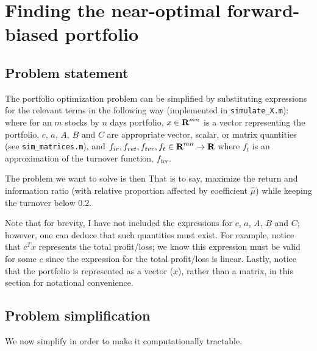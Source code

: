 \documentclass{article}
\begin{document}
 \clearpage
\section{Finding the near-optimal forward-biased portfolio}

\subsection{Problem statement}
    The portfolio optimization problem can be simplified 
        by substituting expressions for the relevant terms in the following way
        (implemented in \verb+simulate_X.m+):
    where for an $m$ stocks by $n$ days portfolio,
        \BI $x \in {\mbox{\bf R}}^{mn}$ is a vector representing the portfolio,
        \I  $c$, $a$, $A$, $B$ and $C$ are appropriate vector, scalar, 
            or matrix quantities (see \verb+sim_matrices.m+), and
        \I  $f_{ir}, f_{ret}, f_{tvr}, f_{t} \in {\mbox{\bf R}}^{mn} \to {\mbox{\bf R}}$
            where $f_{t}$ is an approximation of the turnover function, 
            $f_{tvr}$. \EI

    The problem we want to solve is then
    That is to say, maximize the return and information ratio
        (with relative proportion affected by coefficient $\hat{\mu}$)
        while keeping the turnover below $0.2$.


    Note that for brevity, I have not included the expressions for 
        $c$, $a$, $A$, $B$ and $C$; 
        however, one can deduce that such quantities must exist.
    For example, notice that $c^T x$ represents the total profit/loss;
        we know this expression must be valid for some $c$ 
        since the expression for the total profit/loss is linear.
    Lastly, notice that the portfolio is represented as a vector ($x$),
        rather than a matrix, in this section for notational convenience.

\subsection{Problem simplification}
    We now simplify  in order 
        to make it computationally tractable.
\end{document}
